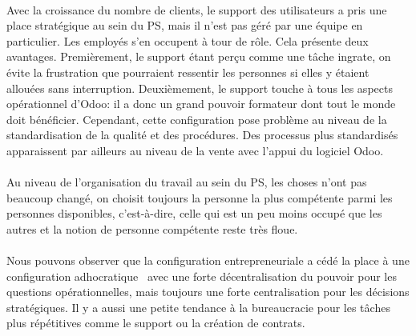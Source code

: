 \paragraph{} Avec la croissance du nombre de clients, le support des utilisateurs a pris une place stratégique au sein du PS, mais il n'est pas géré par une équipe en particulier. Les employés s'en occupent à tour de rôle. Cela présente deux avantages. Premièrement, le support étant perçu comme une tâche ingrate, on évite la frustration que pourraient ressentir les personnes si elles y étaient allouées sans interruption. Deuxièmement, le support touche à tous les aspects opérationnel d'Odoo: il a donc un grand pouvoir formateur dont tout le monde doit bénéficier. Cependant, cette configuration pose problème au niveau de la standardisation de la qualité et des procédures. Des processus plus standardisés apparaissent par ailleurs au niveau de la vente avec l'appui du logiciel Odoo. 

\paragraph{} Au niveau de l'organisation du travail au sein du PS, les choses n'ont pas beaucoup changé, on choisit toujours la personne la plus compétente parmi les personnes disponibles, c'est-à-dire, celle qui est un peu moins occupé que les autres et la notion de personne compétente reste très floue. 

\paragraph{} Nous pouvons observer que la configuration entrepreneuriale a cédé la place à une configuration adhocratique~\citep[pp. 53-54]{pichault} avec une forte décentralisation du pouvoir pour les questions opérationnelles, mais toujours une forte centralisation pour les décisions stratégiques. Il y a aussi une petite tendance à la bureaucracie pour les tâches plus répétitives comme le support ou la création de contrats. 

